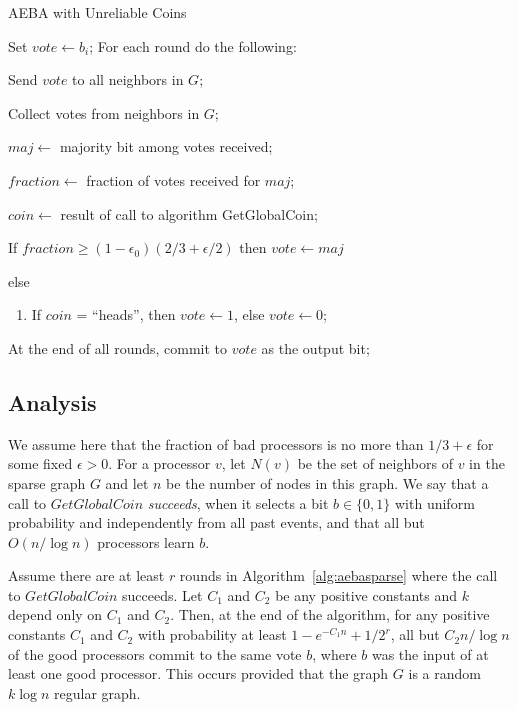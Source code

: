 \documentclass{sig-alternate}
\begin{document}
\begin{algorithm}
\caption{AEBA with Unreliable Coins} \label{alg:aebasparse}
Set $vote \leftarrow b_{i}$; For each round do the following:
\begin{enumerate*}
\item Send $vote$ to all neighbors in $G$;
      \label {step_a}
\item Collect votes from neighbors in $G$;
      \label {step_b}
\item $maj \leftarrow$ majority bit among votes received;
\item $fraction \leftarrow$ fraction of votes received for $maj$;
\item $coin \leftarrow$ result of call to algorithm GetGlobalCoin;
\item If $fraction \geq (1-\epsilon_{0}) (2/3 + \epsilon/2)$ then $vote \leftarrow maj$
\item else
\begin{enumerate}
\item If $coin$ = ``heads'', then $vote \leftarrow 1$, else $vote \leftarrow 0$;
\end{enumerate}
\end{enumerate*}

At the end of all rounds, commit to $vote$ as the output bit;
\end{algorithm}

\subsection{Analysis}

We assume here that the fraction of bad processors is no more than $1/3 + \epsilon$ for some fixed $\epsilon > 0$.  For a processor $v$, let $N(v)$ be the set of neighbors of $v$ in the sparse graph $G$ and let $n$ be the number of nodes in this graph.  We say that a call to $GetGlobalCoin$ \emph{succeeds}, when it selects a bit $b \in \{0,1\}$ with uniform probability and independently from all past events, and that all but $O(n/ \log n)$ processors learn $b$.

\begin{theorem} %
Assume there are at least $r$ rounds in Algorithm~\ref{alg:aebasparse} where the call to $GetGlobalCoin$ succeeds.  Let $C_{1}$ and $C_{2}$ be any positive constants and $k$ depend only on $C_{1}$ and $C_{2}$.  Then, at the end of the algorithm, for any positive constants $C_{1}$ and $C_{2}$ with probability at least $1-e^{-C_{1}n} + 1/2^{r}$, all but $C_{2}n / \log n$ of the good processors commit to the same vote $b$, where $b$ was the input of at least one good processor.   This occurs provided that the graph $G$ is a random $k \log n$ regular graph.
\end{theorem}
\end{document}
